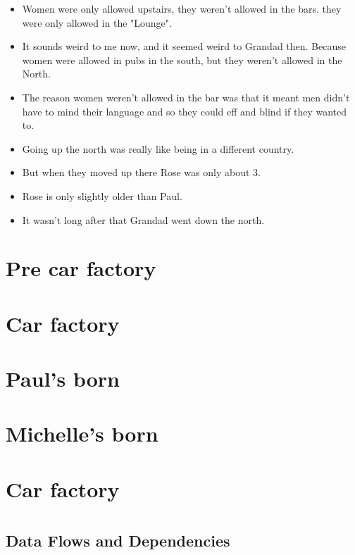 \documentclass[10pt,twocolumn,letterpaper]{article}
\begin{document}
\begin{itemize}
    \item Women were only allowed upstairs, they weren't allowed in the bars. they were only allowed in the "Lounge".
    \item It sounds weird to me now, and it seemed weird to Grandad then. Because women were allowed in pubs in the south, but they weren't allowed in the North.
    \item The reason women weren't allowed in the bar was that it meant men didn't have to mind their language and so they could eff and blind if they wanted to.
    \item Going up the north was really like being in a different country.
    \item But when they moved up there Rose was only about 3.
    \item Rose is only slightly older than Paul.
    \item It wasn't long after that Grandad went down the north.
\end{itemize}



\section{Pre car factory}

\section{Car factory}

\section{Paul's born}

\section{Michelle's born}

\section{Car factory}



\clearpage

\section{}
\subsection{Data Flows and Dependencies}
\end{document}
